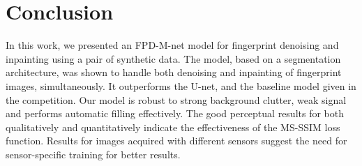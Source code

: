 \documentclass{llncs}
\begin{document}
\section{Conclusion}
In this work, we presented an FPD-M-net model for fingerprint denoising and inpainting using a pair of synthetic data. The model, based on a segmentation architecture, was shown to handle both denoising and inpainting of fingerprint images, simultaneously. It outperforms the U-net, and the baseline model given in the competition. Our model is robust to strong background clutter, weak signal and performs automatic filling effectively. The good perceptual results for both qualitatively and quantitatively indicate the effectiveness of the MS-SSIM loss function. Results for images acquired with different sensors suggest the need for sensor-specific training for better results.



\end{document}
